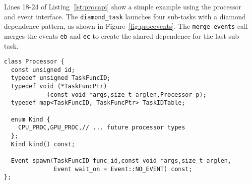 Lines 18-24 of Listing~\ref{lst:procapi} show a simple example using 
the processor and event interface.  The {\tt diamond\_task} launches four
sub-tasks with a diamond dependence pattern, as shown in Figure~\ref{fig:procevents}.
The {\tt merge\_events} call
merges the events {\tt eb} and {\tt ec} to create the shared dependence
for the last sub-task.

\begin{lstlisting}[float={t},label={lst:procapi},caption={Processor Interface.},belowskip=0pt]
class Processor {
  const unsigned id;
  typedef unsigned TaskFuncID;
  typedef void (*TaskFuncPtr)
            (const void *args,size_t arglen,Processor p);
  typedef map<TaskFuncID, TaskFuncPtr> TaskIDTable;

  enum Kind {
    CPU_PROC,GPU_PROC,// ... future processor types
  };
  Kind kind() const;

  Event spawn(TaskFuncID func_id,const void *args,size_t arglen,
              Event wait_on = Event::NO_EVENT) const;
};
\end{lstlisting}


